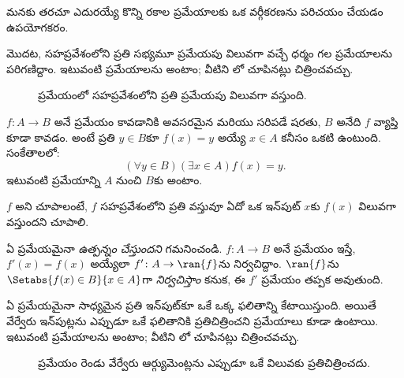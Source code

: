 \documentclass[../../../include/open-logic-section]{subfiles}
\begin{document}

\begin{explain}
మనకు తరచూ ఎదురయ్యే కొన్ని రకాల ప్రమేయాలకు ఒక వర్గీకరణను
పరిచయం చేయడం ఉపయోగకరం.

మొదట, సహప్రవేశంలోని ప్రతి సభ్యమూ ప్రమేయపు విలువగా వచ్చే
ధర్మం గల ప్రమేయాలను పరిగణిద్దాం. ఇటువంటి ప్రమేయాలను
 అంటాం; వీటిని లో చూపినట్లు చిత్రించవచ్చు.

\begin{figure}
  \caption{ ప్రమేయంలో సహప్రవేశంలోని ప్రతి 
    ప్రమేయపు విలువగా వస్తుంది.}
\end{figure}
\end{explain}

\begin{defn}
$f \colon A \rightarrow B$ అనే ప్రమేయం \emph{} కావడానికి
అవసరమైన మరియు సరిపడే షరతు, $B$ అనేది $f$ వ్యాప్తి కూడా కావడం.
అంటే ప్రతి $y \in B$కూ $f(x) = y$ అయ్యే $x \in A$ కనీసం ఒకటి ఉంటుంది.
సంకేతాలలో:
\[
  (\forall y \in B)(\exists x \in A)f(x) = y.
\]
ఇటువంటి ప్రమేయాన్ని $A$ నుంచి $B$కు  అంటాం.
\end{defn}

\begin{explain}
$f$  అని చూపాలంటే, $f$ సహప్రవేశంలోని ప్రతి వస్తువూ
ఏదో ఒక ఇన్‌పుట్ $x$కు $f(x)$ విలువగా వస్తుందని చూపాలి.

ఏ ప్రమేయమైనా  \emph{ఉత్పన్నం చేస్తుందని} గమనించండి.
$f \colon A \to B$ అనే ప్రమేయం ఇస్తే, $f'(x) = f(x)$ అయ్యేలా
$f' \colon A \to \ran{f}$ను నిర్వచిద్దాం.
$\ran{f}$ను $\Setabs{f(x) \in B}{x \in A}$గా \emph{నిర్వచిస్తాం} కనుక,
ఈ $f'$ ప్రమేయం తప్పక  అవుతుంది.
\end{explain}

\begin{explain}
ఏ ప్రమేయమైనా సాధ్యమైన ప్రతి ఇన్‌పుట్‌కూ ఒకే ఒక్క ఫలితాన్ని కేటాయిస్తుంది.
అయితే వేర్వేరు ఇన్‌పుట్లను ఎప్పుడూ ఒకే ఫలితానికి ప్రతిచిత్రించని
ప్రమేయాలు కూడా ఉంటాయి. ఇటువంటి ప్రమేయాలను  అంటాం;
వీటిని లో చూపినట్లు చిత్రించవచ్చు.
\begin{figure}
  \caption{ ప్రమేయం రెండు వేర్వేరు ఆర్గ్యుమెంట్లను
    ఎప్పుడూ ఒకే విలువకు ప్రతిచిత్రించదు.}
\end{figure}
\end{explain}
\end{document}

